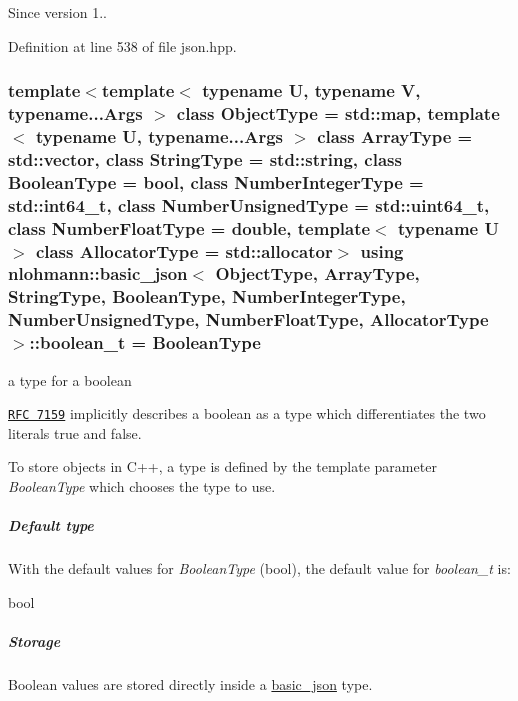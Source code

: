 \begin{DoxySince}{Since}
version 1.. 
\end{DoxySince}


Definition at line 538 of file json.\+hpp.

\hypertarget{classnlohmann_1_1basic__json_af3bc3e83aa162d7ba4df16a949872723}{}
\subsubsection[{boolean\+\_\+t}]{\setlength{\rightskip}{0pt plus 5cm}template$<$template$<$ typename U, typename V, typename...\+Args $>$ class Object\+Type = std\+::map, template$<$ typename U, typename...\+Args $>$ class Array\+Type = std\+::vector, class String\+Type  = std\+::string, class Boolean\+Type  = bool, class Number\+Integer\+Type  = std\+::int64\+\_\+t, class Number\+Unsigned\+Type  = std\+::uint64\+\_\+t, class Number\+Float\+Type  = double, template$<$ typename U $>$ class Allocator\+Type = std\+::allocator$>$ using {\bf nlohmann\+::basic\+\_\+json}$<$ Object\+Type, Array\+Type, String\+Type, Boolean\+Type, Number\+Integer\+Type, Number\+Unsigned\+Type, Number\+Float\+Type, Allocator\+Type $>$\+::{\bf boolean\+\_\+t} =  Boolean\+Type}\label{classnlohmann_1_1basic__json_af3bc3e83aa162d7ba4df16a949872723}


a type for a boolean 

\href{http://rfc7159.net/rfc7159}{\tt R\+F\+C 7159} implicitly describes a boolean as a type which differentiates the two literals {\ttfamily true} and {\ttfamily false}.

To store objects in C++, a type is defined by the template parameter {\itshape Boolean\+Type} which chooses the type to use.

\subparagraph*{Default type}

With the default values for {\itshape Boolean\+Type} ({\ttfamily bool}), the default value for {\itshape boolean\+\_\+t} is\+:


\begin{DoxyCode}
\textcolor{keywordtype}{bool}
\end{DoxyCode}


\subparagraph*{Storage}

Boolean values are stored directly inside a \hyperlink{classnlohmann_1_1basic__json}{basic\+\_\+json} type.

